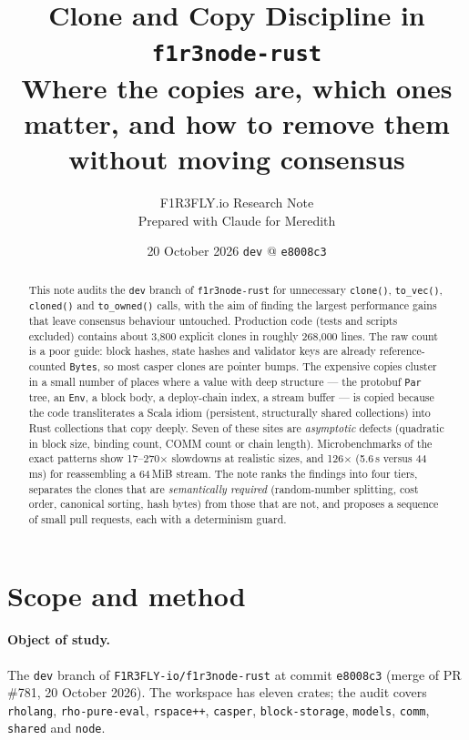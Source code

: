 \documentclass[11pt]{article}
\title{Clone and Copy Discipline in \texttt{f1r3node-rust}\\[0.3em]
\large Where the copies are, which ones matter, and how to remove them without moving consensus}
\author{F1R3FLY.io Research Note\\[0.2em]\small Prepared with Claude for Meredith}
\date{20 October 2026 \quad\textbullet\quad \texttt{dev} @ \texttt{e8008c3}}
\begin{document}
\maketitle

\begin{abstract}
\noindent
This note audits the \texttt{dev} branch of \texttt{f1r3node-rust} for unnecessary
\texttt{clone()}, \texttt{to\_vec()}, \texttt{cloned()} and \texttt{to\_owned()} calls, with the
aim of finding the largest performance gains that leave consensus behaviour untouched.
Production code (tests and scripts excluded) contains about 3{,}800 explicit clones in roughly
268{,}000 lines. The raw count is a poor guide: block hashes, state hashes and validator keys are
already reference-counted \texttt{Bytes}, so most casper clones are pointer bumps. The expensive
copies cluster in a small number of places where a value with deep structure --- the
protobuf \texttt{Par} tree, an \texttt{Env}, a block body, a deploy-chain index, a stream buffer ---
is copied because the code transliterates a Scala idiom (persistent, structurally shared
collections) into Rust collections that copy deeply. Seven of these sites are
\emph{asymptotic} defects (quadratic in block size, binding count, COMM count or chain length).
Microbenchmarks of the exact patterns show 17--270$\times$ slowdowns at realistic sizes, and
126$\times$ (5.6\,s versus 44\,ms) for reassembling a 64\,MiB stream. The note ranks the findings
into four tiers, separates the clones that are \emph{semantically required} (random-number
splitting, cost order, canonical sorting, hash bytes) from those that are not, and proposes a
sequence of small pull requests, each with a determinism guard.
\end{abstract}

\tableofcontents
\newpage

\section{Scope and method}

\paragraph{Object of study.} The \texttt{dev} branch of \texttt{F1R3FLY-io/f1r3node-rust} at
commit \texttt{e8008c3} (merge of PR \#781, 20 October 2026). The workspace has eleven crates;
the audit covers \texttt{rholang}, \texttt{rho-pure-eval}, \texttt{rspace++}, \texttt{casper},
\texttt{block-storage}, \texttt{models}, \texttt{comm}, \texttt{shared} and \texttt{node}.
\end{document}
